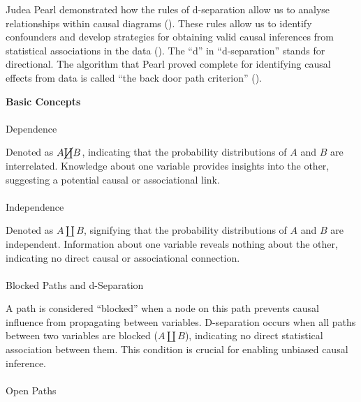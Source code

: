 \documentclass[
  singlecolumn]{article}
\makeatletter
\let\oldparagraph\paragraph
\renewcommand{\paragraph}{
    \@ifstar
      \xxxParagraphStar
      \xxxParagraphNoStar
  }
\newcommand{\xxxParagraphStar}[1]{\oldparagraph*{#1}\mbox{}}
\newcommand{\xxxParagraphNoStar}[1]{\oldparagraph{#1}\mbox{}}
\makeatother
\begin{document}
Judea Pearl demonstrated how the rules of d-separation allow us to
analyse relationships within causal diagrams
(). These rules allow us to identify
confounders and develop strategies for obtaining valid causal inferences
from statistical associations in the data
(). The ``d'' in ``d-separation''
stands for directional. The algorithm that Pearl proved complete for
identifying causal effects from data is called ``the back door path
criterion'' ().

\textbf{Basic Concepts}

\paragraph{Dependence}\label{dependence}

Denoted as \(A \cancel\coprod B\), indicating that the probability
distributions of \(A\) and \(B\) are interrelated. Knowledge about one
variable provides insights into the other, suggesting a potential causal
or associational link.

\paragraph{Independence}\label{independence}

Denoted as \(A \coprod B\), signifying that the probability
distributions of \(A\) and \(B\) are independent. Information about one
variable reveals nothing about the other, indicating no direct causal or
associational connection.

\paragraph{Blocked Paths and
d-Separation}\label{blocked-paths-and-d-separation}

A path is considered ``blocked'' when a node on this path prevents
causal influence from propagating between variables. D-separation occurs
when all paths between two variables are blocked (\(A \coprod B\)),
indicating no direct statistical association between them. This
condition is crucial for enabling unbiased causal inference.

\paragraph{Open Paths}\label{open-paths}
\end{document}
